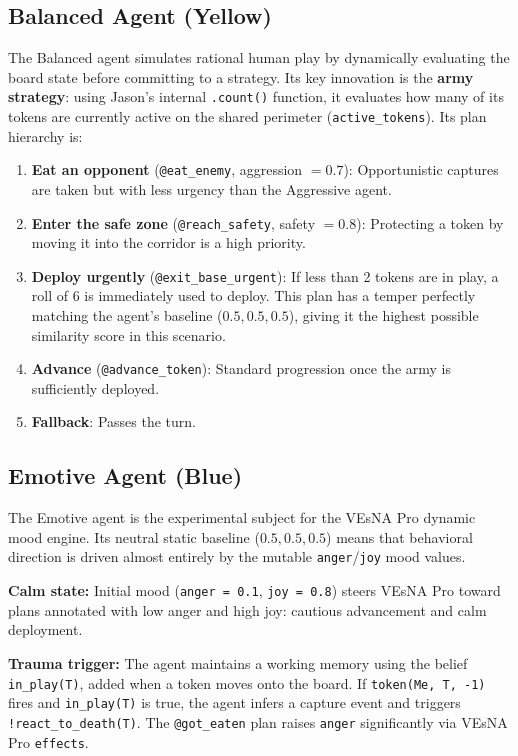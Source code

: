 \documentclass[12pt]{article}
\begin{document}
\subsection{Balanced Agent (Yellow)}
\label{subsec:agent_balanced}
\noindent The Balanced agent simulates rational human play by dynamically
evaluating the board state before committing to a strategy. Its key innovation
is the \textbf{army strategy}: using Jason's internal \texttt{.count()} function,
it evaluates how many of its tokens are currently active on the shared perimeter
(\texttt{active\_tokens}). Its plan hierarchy is:

\begin{enumerate}
    \item \textbf{Eat an opponent} (\texttt{@eat\_enemy}, aggression $= 0.7$):
    Opportunistic captures are taken but with less urgency than the Aggressive agent.
    \item \textbf{Enter the safe zone} (\texttt{@reach\_safety}, safety $= 0.8$):
    Protecting a token by moving it into the corridor is a high priority.
    \item \textbf{Deploy urgently} (\texttt{@exit\_base\_urgent}): If less than
    2 tokens are in play, a roll of 6 is immediately used to deploy. This plan has
    a temper perfectly matching the agent's baseline ($0.5, 0.5, 0.5$), giving it
    the highest possible similarity score in this scenario.
    \item \textbf{Advance} (\texttt{@advance\_token}): Standard progression
    once the army is sufficiently deployed.
    \item \textbf{Fallback}: Passes the turn.
\end{enumerate}

\subsection{Emotive Agent (Blue)}
\label{subsec:agent_emotive}
\noindent The Emotive agent is the experimental subject for the VEsNA Pro dynamic
mood engine. Its neutral static baseline ($0.5, 0.5, 0.5$) means that behavioral
direction is driven almost entirely by the mutable \texttt{anger}/\texttt{joy}
mood values.

\noindent \textbf{Calm state:} Initial mood (\texttt{anger = 0.1},
\texttt{joy = 0.8}) steers VEsNA Pro toward plans annotated with low anger and
high joy: cautious advancement and calm deployment.

\noindent \textbf{Trauma trigger:} The agent maintains a working memory using the
belief \texttt{in\_play(T)}, added when a token moves onto the board. If
\texttt{token(Me, T, -1)} fires and \texttt{in\_play(T)} is true, the agent
infers a capture event and triggers \\ \texttt{!react\_to\_death(T)}. The
\texttt{@got\_eaten} plan raises \texttt{anger} significantly via VEsNA Pro
\texttt{effects}.
\end{document}
